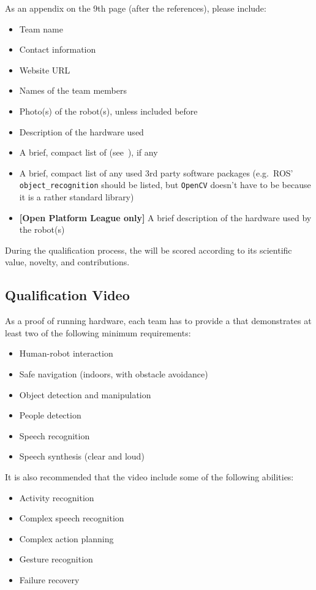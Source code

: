 As an appendix on the 9th page (after the references), please include:
\begin{itemize}
	\item Team name
	\item Contact information
	\item Website URL
	\item Names of the team members
	\item Photo(s) of the robot(s), unless included before
	\item Description of the hardware used
	\item A brief, compact list of  (see~), if any
	\item A brief, compact list of any used 3rd party software packages (e.g.~ROS' \texttt{object\_recognition} should be listed, but \texttt{OpenCV} doesn't have to be because it is a rather standard library)
	\item \textbf{[Open Platform League only]} A brief description of the hardware used by the robot(s)
\end{itemize}

During the qualification process, the \TDP{} will be scored according to its scientific value, novelty, and contributions.

\subsection{Qualification Video}

As a proof of running hardware, each team has to provide a  that demonstrates at least two of the following minimum requirements:
\begin{itemize}
	\item Human-robot interaction
	\item Safe navigation (indoors, with obstacle avoidance)
	\item Object detection and manipulation
	\item People detection
	\item Speech recognition
	\item Speech synthesis (clear and loud)
\end{itemize}

It is also recommended that the video include some of the following abilities:
\begin{itemize}
	\item Activity recognition
	\item Complex speech recognition
	\item Complex action planning
	\item Gesture recognition
	\item Failure recovery
\end{itemize}

